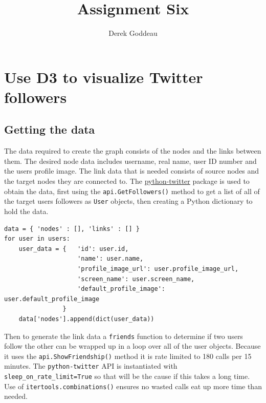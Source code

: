 \documentclass[12pt, a4paper]{article}
\author{Derek Goddeau}
\title{Assignment Six}
\newcommand{\code}[1]{\texttt{#1}}
\begin{document}
\maketitle

\newpage



\section{Use D3 to visualize Twitter followers}

\subsection{Getting the data}

The data required to create the graph consists of the nodes and the links between them. The desired node data includes username, real name, user ID number and the users profile image. The link data that is needed consists of source nodes and the target nodes they are connected to. The \href{https://github.com/bear/python-twitter}{python-twitter} package is used to obtain the data, first using the \code{api.GetFollowers()} method to get a list of all of the target users followers as \code{User} objects, then creating a Python dictionary to hold the data.


\begin{minipage}{\linewidth} %
\vspace{2em}
\begin{verbatim}
data = { 'nodes' : [], 'links' : [] }
for user in users:
    user_data = {   'id': user.id,
                    'name': user.name,
                    'profile_image_url': user.profile_image_url,
                    'screen_name': user.screen_name,
                    'default_profile_image': user.default_profile_image
                }
    data['nodes'].append(dict(user_data))
\end{verbatim}
\vspace{2em}
\end{minipage}

Then to generate the link data a \code{friends} function to determine if two users follow the other can be wrapped up in a loop over all of the user objects. Because it uses the \code{api.ShowFriendship()} method it is rate limited to 180 calls per 15 minutes. The \code{python-twitter} API is instantiated with \code{sleep\_on\_rate\_limit=True} so that will be the cause if this takes a long time. Use of \code{itertools.combinations()} ensures no wasted calls eat up more time than needed.
\end{document}
